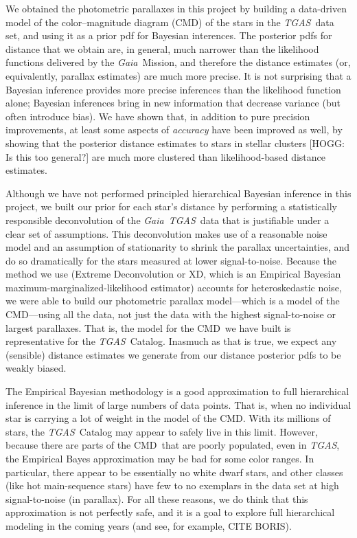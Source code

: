 \documentclass[modern]{aastex61}
\newcommand{\acronym}[1]{{\small{#1}}}
\newcommand{\project}[1]{\textsl{#1}}
\newcommand{\tgas}{\project{\acronym{TGAS}}}
\newcommand{\gaia}{\project{Gaia}}
\newcommand{\xd}{\acronym{XD}}
\newcommand{\cmd}{\acronym{CMD}}
\begin{document}
We obtained the photometric parallaxes in this project
by building a data-driven model of the
color--magnitude diagram (\cmd) of the stars in the \tgas\ data set,
and using it as a prior pdf for Bayesian interences.
The posterior pdfs for distance that we obtain are, in general, much
narrower than the likelihood functions delivered by the
\gaia\ Mission, and therefore the distance estimates (or,
equivalently, parallax estimates) are much more precise.
It is not surprising that a Bayesian inference provides more
precise inferences than the likelihood function alone; Bayesian
inferences bring in new information that decrease variance (but
often introduce bias).
We have shown that, in addition to pure precision improvements, at
least some aspects of \emph{accuracy} have been improved as well, by
showing that the posterior distance estimates to stars in stellar
clusters [HOGG: Is this too general?] are much more clustered than likelihood-based distance
estimates.

Although we have not performed principled hierarchical Bayesian inference in this
project, we built our prior for each star's distance by
performing a statistically responsible deconvolution
of the \gaia\ \tgas\ data that is justifiable under a clear set of
assumptions.
This deconvolution makes use of a reasonable noise model and an
assumption of stationarity to shrink the parallax uncertainties, and
do so dramatically for the stars measured at lower signal-to-noise.
Because the method we use (Extreme Deconvolution or \xd, which is
an Empirical Bayesian maximum-marginalized-likelihood estimator) accounts for
heteroskedastic noise, we were able to build our photometric parallax
model---which is a model of the \cmd---using
all the data, not just the data with the highest signal-to-noise or
largest parallaxes.
That is, the model for the \cmd\ we have built is representative for
the \tgas\ Catalog.
Inasmuch as that is true, we expect any (sensible) distance estimates
we generate from our distance posterior pdfs to be weakly biased.

The Empirical Bayesian methodology is a good approximation to full
hierarchical inference in the limit of large numbers of data points.
That is, when no individual star is carrying a lot of weight in the
model of the \cmd.
With its millions of stars, the \tgas\ Catalog may appear to safely
live in this limit.
However, because there are parts of the \cmd\ that are poorly populated,
even in \tgas, the Empirical Bayes approximation may be bad for some
color ranges.
In particular, there appear to be essentially no white dwarf stars,
and other classes (like hot main-sequence stars) have few to no exemplars
in the data set at high signal-to-noise (in parallax).
For all these reasons, we do think that this approximation is not perfectly
safe, and it is a goal to explore full hierarchical modeling in the coming
years (and see, for example, CITE BORIS).
\end{document}
